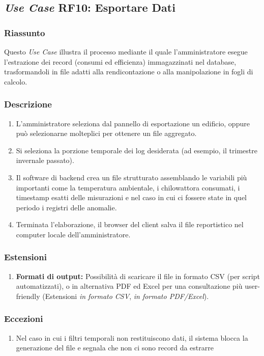     \subsection*{\textit{Use Case} RF10: Esportare Dati}
        \subsubsection*{Riassunto}
            Questo \textit{Use Case} illustra il processo mediante  il quale l’amministratore esegue l’estrazione dei record (consumi ed efficienza) immagazzinati nel database, trasformandoli in file adatti alla rendicontazione o alla manipolazione in fogli di calcolo.

        \subsubsection*{Descrizione}
            \begin{enumerate}
                \item L’amministratore seleziona dal pannello di esportazione un edificio, oppure può selezionarne molteplici per ottenere un file aggregato.
                \item Si seleziona la porzione temporale dei log desiderata (ad esempio, il trimestre invernale passato).
                \item Il software di backend crea un file strutturato assemblando le variabili più importanti come la temperatura ambientale, i chilowattora consumati, i timestamp esatti delle misurazioni e nel caso in cui ci fossere state in quel periodo i registri delle anomalie.
                \item Terminata l’elaborazione, il browser del client salva il file reportistico nel computer locale dell’amministratore.
            \end{enumerate}
        \subsubsection*{Estensioni}
            \begin{enumerate}
                \item \textbf{Formati di output:} Possibilità di scaricare il file in formato CSV (per script automatizzati), o in alternativa PDF ed Excel per una consultazione più user-friendly (Estensioni \textit{in formato CSV}, \textit{in formato PDF/Excel}).
            \end{enumerate}
        \subsubsection*{Eccezioni}
            \begin{enumerate}
                \item Nel caso in cui i filtri temporali non restituiscono dati, il sistema blocca la generazione del file e segnala che non ci sono record da estrarre
            \end{enumerate}

